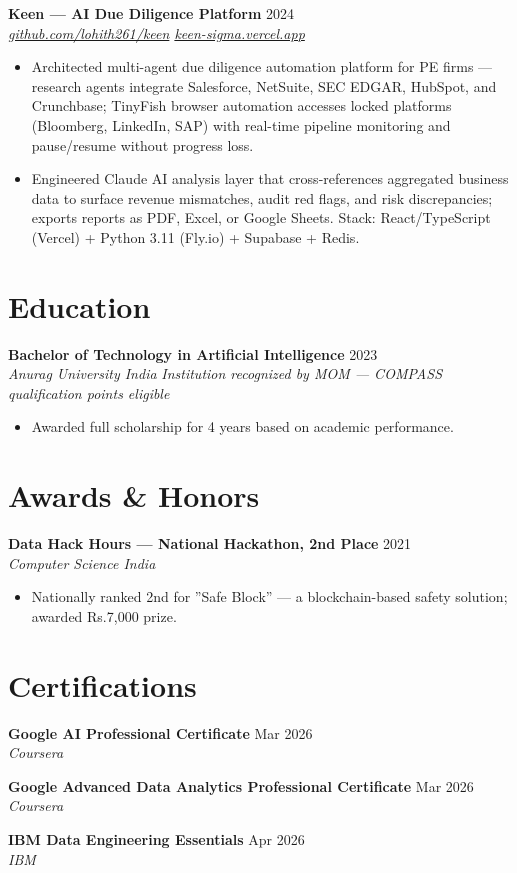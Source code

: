 \documentclass[10pt,letterpaper]{article}
\newcommand{\entry}[3]{%
  \vspace{3pt}\textbf{#1} \hfill #3 \\
  \textit{\small #2}\vspace{1pt}}
\begin{document}
\entry{Keen --- AI Due Diligence Platform}{\href{https://github.com/lohith261/keen}{github.com/lohith261/keen} \quad\textbullet\quad \href{https://keen-sigma.vercel.app/}{keen-sigma.vercel.app}}{2024}
\begin{itemize}
  \item Architected multi-agent due diligence automation platform for PE firms --- research agents integrate Salesforce, NetSuite, SEC EDGAR, HubSpot, and Crunchbase; TinyFish browser automation accesses locked platforms (Bloomberg, LinkedIn, SAP) with real-time pipeline monitoring and pause/resume without progress loss.
  \item Engineered Claude AI analysis layer that cross-references aggregated business data to surface revenue mismatches, audit red flags, and risk discrepancies; exports reports as PDF, Excel, or Google Sheets. Stack: React/TypeScript (Vercel) + Python 3.11 (Fly.io) + Supabase + Redis.
\end{itemize}

\section{Education}

\entry{Bachelor of Technology in Artificial Intelligence}{Anurag University \textbullet{} India}{2023}
\newline\textit{\small Institution recognized by MOM --- COMPASS qualification points eligible}
\begin{itemize}
  \item Awarded full scholarship for 4 years based on academic performance.
\end{itemize}

\section{Awards \& Honors}

\textbf{Data Hack Hours --- National Hackathon, 2nd Place} \hfill 2021 \\
\textit{Computer Science India}
\begin{itemize}
  \item Nationally ranked 2nd for ''Safe Block'' --- a blockchain-based safety solution; awarded Rs.7,000 prize.
\end{itemize}

\section{Certifications}

\textbf{Google AI Professional Certificate} \hfill Mar 2026 \\
\textit{Coursera}

\textbf{Google Advanced Data Analytics Professional Certificate} \hfill Mar 2026 \\
\textit{Coursera}

\textbf{IBM Data Engineering Essentials} \hfill Apr 2026 \\
\textit{IBM}
\end{document}
